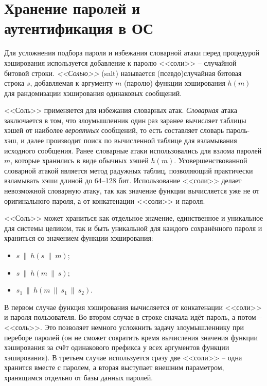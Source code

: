 \section[Пароли и аутентификация в ОС]{Хранение паролей и \protect\\ аутентификация в ОС}

Для усложнения подбора пароля и избежания словарной атаки перед процедурой хэширования используется добавление к паролю <<соли>> -- случайной битовой строки. \emph{<<Солью>>} (salt) называется (псевдо)случайная битовая строка $s$, добавляемая к аргументу $m$ (паролю) функции хэширования $h(m)$ для рандомизации хэширования одинаковых сообщений.

<<Соль>> применяется для избежания словарных атак. \emph{Словарная} атака заключается в том, что злоумышленник один раз заранее вычисляет таблицы хэшей от наиболее \emph{вероятных} сообщений, то есть составляет словарь пароль-хэш, и далее производит поиск по вычисленной таблице для взламывания исходного сообщения. Ранее словарные атаки использовались для взлома паролей $m$, которые хранились в виде обычных хэшей $h(m)$. Усовершенствованной словарной атакой является метод радужных таблиц, позволяющий практически взламывать хэши длиной до 64--128 бит. Использование <<соли>> делает невозможной словарную атаку, так как значение функции вычисляется уже не от оригинального пароля, а от конкатенации <<соли>> и пароля.

<<Соль>> может храниться как отдельное значение, единственное и уникальное для системы целиком, так и быть уникальной для каждого сохранённого пароля и храниться со значением функции хэширования:
\begin{itemize}
	\item $s ~\|~ h(s ~\|~ m)$;
	\item $s ~\|~ h(m ~\|~ s)$;
	\item $s_1 ~\|~ h(m ~\|~ s_1 ~\|~ s_2)$.
\end{itemize}

В первом случае функция хэширования вычисляется от конкатенации <<соли>> и пароля пользователя. Во втором случае в строке сначала идёт пароль, а потом -- <<соль>>. Это позволяет немного усложнить задачу злоумышленнику при переборе паролей (он не сможет сократить время вычисления значения функции хэширования за счёт одинакового префикса у всех аргументов функции хэширования). В третьем случае используется сразу две <<соли>> -- одна хранится вместе с паролем, а вторая выступает внешним параметром, хранящимся отдельно от базы данных паролей.

